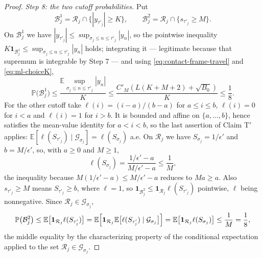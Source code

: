 \begin{proof}
\emph{Step 8: the two cutoff probabilities.}
Put
\[
  \mathcal B^1_j=\mathcal R_j\cap\bigl\{|y_{\tau'_j}|\ge K\bigr\},\qquad
  \mathcal B^2_j=\mathcal R_j\cap\bigl\{s_{\tau'_j}\ge M\bigr\}.
\]
On $\mathcal B^1_j$ we have
$|y_{\tau'_j}|\le\sup_{\sigma_j\le n\le\tau'_j}|y_n|$, so the pointwise
inequality $K\mathbf1_{\mathcal B^1_j}\le\sup_{\sigma_j\le n\le\tau'_j}|y_n|$
holds; integrating it --- legitimate because that supremum is integrable by
Step 7 --- and using \eqref{eq:contact-frame-travel} and
\eqref{eq:ml-choiceK},
\begin{equation}\label{eq:ml-prob1}
  \mathbb P\bigl(\mathcal B^1_j\bigr)
   \le\frac{\mathbb E\sup_{\sigma_j\le n\le\tau'_j}|y_n|}{K}
   \le\frac{C'_M(L(K+M+2)+\sqrt{B_0})}{K}\le\frac18 .
\end{equation}
For the other cutoff take $\ell(i)=(i-a)/(b-a)$ for $a\le i\le b$,
$\ell(i)=0$ for $i<a$ and $\ell(i)=1$ for $i>b$. It is bounded and affine on
$\{a,\dots,b\}$, hence satisfies the mean-value identity for $a<i<b$, so the
last assertion of Claim T$'$ applies:
$\mathbb E[\ell(S_{\tau'_j})\mid\mathcal G_{\sigma_j}]=\ell(S_{\sigma_j})$
a.e. On $\mathcal R_j$ we have $S_{\sigma_j}=1/\epsilon'$ and $b=M/\epsilon'$,
so, with $a\ge0$ and $M\ge1$,
\[
  \ell(S_{\sigma_j})
   =\frac{1/\epsilon'-a}{M/\epsilon'-a}\le\frac1M ,
\]
the inequality because $M(1/\epsilon'-a)\le M/\epsilon'-a$ reduces to
$Ma\ge a$. Also $s_{\tau'_j}\ge M$ means $S_{\tau'_j}\ge b$, where
$\ell=1$, so $\mathbf1_{\mathcal B^2_j}\le\mathbf1_{\mathcal R_j}
 \ell(S_{\tau'_j})$ pointwise, $\ell$ being nonnegative. Since
$\mathcal R_j\in\mathcal G_{\sigma_j}$,
\begin{equation}\label{eq:ml-prob2}
  \mathbb P\bigl(\mathcal B^2_j\bigr)
   \le\mathbb E\bigl[\mathbf1_{\mathcal R_j}\ell(S_{\tau'_j})\bigr]
   =\mathbb E\Bigl[\mathbf1_{\mathcal R_j}
       \mathbb E\bigl[\ell(S_{\tau'_j})\mid\mathcal G_{\sigma_j}\bigr]\Bigr]
   =\mathbb E\bigl[\mathbf1_{\mathcal R_j}\ell(S_{\sigma_j})\bigr]
   \le\frac1M=\frac18 ,
\end{equation}
the middle equality by the characterizing property of the conditional
expectation applied to the set $\mathcal R_j\in\mathcal G_{\sigma_j}$.


\end{proof}
